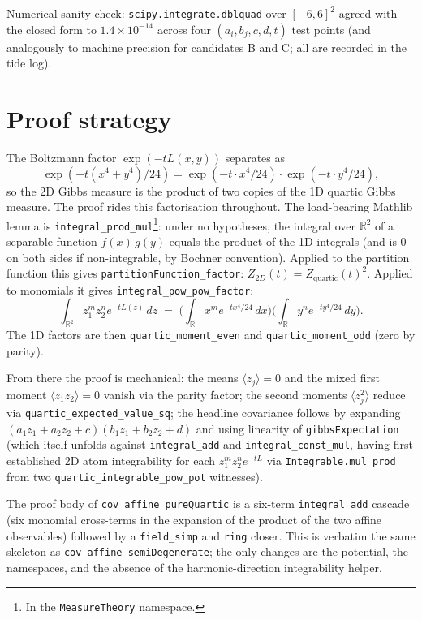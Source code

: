 \documentclass[11pt]{article}
\begin{document}
Numerical sanity check: \texttt{scipy.integrate.dblquad} over $[-6,6]^2$
agreed with the closed form to $1.4\times 10^{-14}$ across four
$(a_i,b_j,c,d,t)$ test points (and analogously to machine precision for
candidates B and C; all are recorded in the tide log).

\section{Proof strategy}

The Boltzmann factor $\exp(-t L(x,y))$ separates as
\[
  \exp(-t (x^4 + y^4)/24)
  = \exp(-t \cdot x^4/24) \cdot \exp(-t \cdot y^4/24),
\]
so the 2D Gibbs measure is the product of two copies of the 1D quartic
Gibbs measure. The proof rides this factorisation throughout. The
load-bearing Mathlib lemma is
\texttt{integral\_prod\_mul}\footnote{In the
\texttt{MeasureTheory} namespace.}: under no hypotheses, the integral
over $\mathbb{R}^2$ of a separable function $f(x)\,g(y)$ equals the
product of the 1D integrals (and is $0$ on both sides if non-integrable,
by Bochner convention). Applied to the partition function this gives
\texttt{partitionFunction\_factor}: $Z_{2D}(t) =
Z_{\text{quartic}}(t)^2$. Applied to monomials it gives
\texttt{integral\_pow\_pow\_factor}:
\[
  \int_{\mathbb{R}^2} z_1^m z_2^n e^{-t L(z)} \,dz
  \;=\; \Big(\int_\mathbb{R} x^m e^{-t x^4/24}\,dx\Big)
        \Big(\int_\mathbb{R} y^n e^{-t y^4/24}\,dy\Big).
\]
The 1D factors are then \texttt{quartic\_moment\_even} and
\texttt{quartic\_moment\_odd} (zero by parity).

From there the proof is mechanical: the means $\langle z_j\rangle = 0$
and the mixed first moment $\langle z_1 z_2\rangle = 0$ vanish via the
parity factor; the second moments $\langle z_j^2\rangle$ reduce via
\texttt{quartic\_expected\_value\_sq}; the headline covariance follows by
expanding $(a_1 z_1 + a_2 z_2 + c)(b_1 z_1 + b_2 z_2 + d)$ and using
linearity of \texttt{gibbsExpectation} (which itself unfolds against
\texttt{integral\_add} and \texttt{integral\_const\_mul}, having first
established 2D atom integrability for each $z_1^m z_2^n e^{-t L}$ via
\texttt{Integrable.mul\_prod} from two
\texttt{quartic\_integrable\_pow\_pot} witnesses).

The proof body of \texttt{cov\_affine\_pureQuartic} is a six-term
\texttt{integral\_add} cascade (six monomial cross-terms in the
expansion of the product of the two affine observables) followed by a
\texttt{field\_simp} and \texttt{ring} closer. This is verbatim the same
skeleton as \texttt{cov\_affine\_semiDegenerate}; the only changes are
the potential, the namespaces, and the absence of the harmonic-direction
integrability helper.
\end{document}
